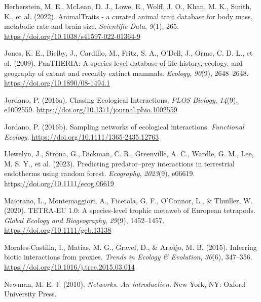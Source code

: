 \documentclass[
]{agujournal2019}
\newlength{\cslhangindent}
\newenvironment{CSLReferences}[2] %
 {\begin{list}{}{%
  \setlength{\itemindent}{0pt}
  \setlength{\leftmargin}{0pt}
  \setlength{\parsep}{0pt}
  \ifodd #1
   \setlength{\leftmargin}{\cslhangindent}
   \setlength{\itemindent}{-1\cslhangindent}
  \fi
  \setlength{\itemsep}{#2\baselineskip}}}
 {\end{list}}
\begin{document}
\begin{CSLReferences}{1}{0}
Herberstein, M. E., McLean, D. J., Lowe, E., Wolff, J. O., Khan, M. K.,
Smith, K., et al. (2022). {AnimalTraits} - a curated animal trait
database for body mass, metabolic rate and brain size. \emph{Scientific
Data}, \emph{9}(1), 265.
\url{https://doi.org/10.1038/s41597-022-01364-9}

Jones, K. E., Bielby, J., Cardillo, M., Fritz, S. A., O'Dell, J., Orme,
C. D. L., et al. (2009). {PanTHERIA}: A species-level database of life
history, ecology, and geography of extant and recently extinct mammals.
\emph{Ecology}, \emph{90}(9), 2648--2648.
\url{https://doi.org/10.1890/08-1494.1}

Jordano, P. (2016a). Chasing {Ecological Interactions}. \emph{PLOS
Biology}, \emph{14}(9), e1002559.
\url{https://doi.org/10.1371/journal.pbio.1002559}

Jordano, P. (2016b). Sampling networks of ecological interactions.
\emph{Functional Ecology}. \url{https://doi.org/10.1111/1365-2435.12763}

Llewelyn, J., Strona, G., Dickman, C. R., Greenville, A. C., Wardle, G.
M., Lee, M. S. Y., et al. (2023). Predicting predator--prey interactions
in terrestrial endotherms using random forest. \emph{Ecography},
\emph{2023}(9), e06619. \url{https://doi.org/10.1111/ecog.06619}

Maiorano, L., Montemaggiori, A., Ficetola, G. F., O'Connor, L., \&
Thuiller, W. (2020). {TETRA-EU} 1.0: {A} species-level trophic metaweb
of {European} tetrapods. \emph{Global Ecology and Biogeography},
\emph{29}(9), 1452--1457. \url{https://doi.org/10.1111/geb.13138}

Morales-Castilla, I., Matias, M. G., Gravel, D., \& Araújo, M. B.
(2015). Inferring biotic interactions from proxies. \emph{Trends in
Ecology \& Evolution}, \emph{30}(6), 347--356.
\url{https://doi.org/10.1016/j.tree.2015.03.014}

Newman, M. E. J. (2010). \emph{Networks. {An} introduction}. New York,
NY: Oxford University Press.


\end{CSLReferences}
\end{document}
